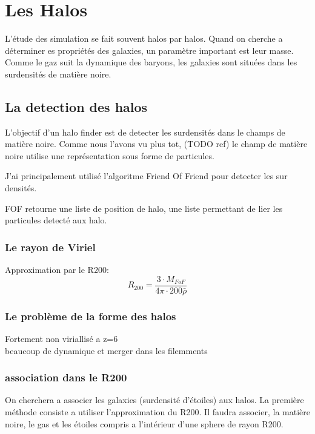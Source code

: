 \chapter{Les Halos}

L'étude des simulation se fait souvent halos par halos.
Quand on cherche a déterminer es propriétés des galaxies, un paramètre important est leur masse.
Comme le gaz suit la dynamique des baryons, les galaxies sont situées dans les surdensités de matière noire.


\section{La detection des halos}

L'objectif d'un halo finder est de detecter les surdensités dans le champs de matière noire.
Comme nous l'avons vu plus tot, (TODO ref) le champ de matière noire utilise une représentation sous forme de particules.

J'ai principalement utilisé l'algoritme Friend Of Friend pour detecter les sur densités.

FOF retourne une liste de position de halo, une liste permettant de lier les particules detecté aux halo.

\subsection{Le rayon de Viriel}
Approximation par le R200:
\begin{equation}
R_{200}=\frac{3\cdot M_{FoF} }{4\pi\cdot 200 \bar{\rho} }
\end{equation}


\subsection{Le problème de la forme des halos}
Fortement non viriallisé a z=6\\
beaucoup de dynamique et merger dans les filemments

\subsection{association dans le R200}

On cherchera a associer les galaxies  (surdensité d'étoiles) aux halos.
La première méthode consiste a utiliser l'approximation du R200.
Il faudra associer, la matière noire, le gas et les étoiles compris a l'intérieur d'une sphere de rayon R200.

